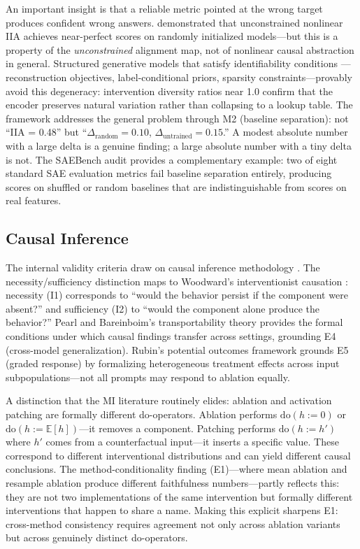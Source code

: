 \documentclass{article}
\begin{document}
An important insight is that a reliable metric pointed at the wrong target produces confident wrong answers. \citet{sutter2025nonlinear} demonstrated that unconstrained nonlinear IIA achieves near-perfect scores on randomly initialized models---but this is a property of the \emph{unconstrained} alignment map, not of nonlinear causal abstraction in general. Structured generative models that satisfy identifiability conditions \citep{khemakhem2020variational}---reconstruction objectives, label-conditional priors, sparsity constraints---provably avoid this degeneracy: intervention diversity ratios near 1.0 confirm that the encoder preserves natural variation rather than collapsing to a lookup table. The framework addresses the general problem through M2 (baseline separation): not ``IIA = 0.48'' but ``$\Delta_{\text{random}} = 0.10$, $\Delta_{\text{untrained}} = 0.15$.'' A modest absolute number with a large delta is a genuine finding; a large absolute number with a tiny delta is not. The SAEBench audit \citep{karvonen2025saebench} provides a complementary example: two of eight standard SAE evaluation metrics fail baseline separation entirely, producing scores on shuffled or random baselines that are indistinguishable from scores on real features.


\subsection{Causal Inference}
\label{sec:causal}

The internal validity criteria draw on causal inference methodology \citep{pearl2009causality, spirtes2000causation}. The necessity/sufficiency distinction maps to Woodward's interventionist causation \citep{woodward2003making}: necessity (I1) corresponds to ``would the behavior persist if the component were absent?'' and sufficiency (I2) to ``would the component alone produce the behavior?'' Pearl and Bareinboim's transportability theory \citep{pearl2011transportability} provides the formal conditions under which causal findings transfer across settings, grounding E4 (cross-model generalization). Rubin's potential outcomes framework grounds E5 (graded response) by formalizing heterogeneous treatment effects across input subpopulations---not all prompts may respond to ablation equally.

A distinction that the MI literature routinely elides: ablation and activation patching are formally different do-operators. Ablation performs $\mathrm{do}(h := 0)$ or $\mathrm{do}(h := \mathbb{E}[h])$---it removes a component. Patching performs $\mathrm{do}(h := h')$ where $h'$ comes from a counterfactual input---it inserts a specific value. These correspond to different interventional distributions and can yield different causal conclusions. The method-conditionality finding (E1)---where mean ablation and resample ablation produce different faithfulness numbers---partly reflects this: they are not two implementations of the same intervention but formally different interventions that happen to share a name. Making this explicit sharpens E1: cross-method consistency requires agreement not only across ablation variants but across genuinely distinct do-operators.
\end{document}
